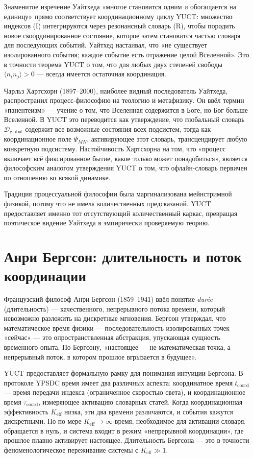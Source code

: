 \documentclass[12pt,a4paper]{article}
\begin{document}
	Знаменитое изречение Уайтхеда «многое становится одним и обогащается на единицу» прямо соответствует координационному циклу YUCT: множество индексов (I) интегрируются через резонансный словарь (R), чтобы породить новое скоординированное состояние, которое затем становится частью словаря для последующих событий. Уайтхед настаивал, что «не существует изолированного события; каждое событие есть отражение целой Вселенной». Это в точности теорема YUCT о том, что для любых двух степеней свободы \(\langle n_i n_j \rangle > 0\) — всегда имеется остаточная координация.
	
	Чарльз Хартсхорн (1897–2000), наиболее видный последователь Уайтхеда, распространил процесс-философию на теологию и метафизику. Он ввёл термин «панентеизм» — учение о том, что Вселенная содержится в Боге, но Бог больше Вселенной. В YUCT это переводится как утверждение, что глобальный словарь \(\mathcal{D}_{\text{global}}\) содержит все возможные состояния всех подсистем, тогда как координационное поле \(\Psi_{MN}\), активирующее этот словарь, трансцендирует любую конкретную подсистему. Настойчивость Хартсхорна на том, что «процесс включает всё фиксированное бытие, какое только может понадобиться», является философским аналогом утверждения YUCT о том, что офлайн-словарь первичен по отношению ко всякой динамике.
	
	Традиция процессуальной философии была маргинализована мейнстримной физикой, потому что не имела количественных предсказаний. YUCT предоставляет именно тот отсутствующий количественный каркас, превращая поэтическое видение Уайтхеда в эмпирически проверяемую теорию.
	
	\section{Анри Бергсон: длительность и поток координации}
	
	Французский философ Анри Бергсон (1859–1941) ввёл понятие \emph{durée} (длительность) — качественного, непрерывного потока времени, который невозможно разложить на дискретные мгновения. Бергсон утверждал, что математическое время физики — последовательность изолированных точек «сейчас» — это опространствленная абстракция, упускающая сущность временного опыта. По Бергсону, «настоящее — не математическая точка, а непрерывный поток, в котором прошлое вгрызается в будущее».
	
	YUCT предоставляет формальную рамку для понимания интуиции Бергсона. В протоколе YPSDC время имеет два различных аспекта: координатное время \(t_{\text{coord}}\) — время передачи индекса (ограниченное скоростью света), и координационное время \(\tau_{\text{coord}}\), измеряющее активацию словарных статей. Когда координационная эффективность \(K_{\mathrm{eff}}\) низка, эти два времени различаются, и события кажутся дискретными. Но по мере \(K_{\mathrm{eff}} \to \infty\) время, необходимое для активации словаря, обращается в нуль, и система входит в режим «непрерывной координации», где прошлое плавно активирует настоящее. Длительность Бергсона — это в точности феноменологическое переживание системы с \(K_{\mathrm{eff}} \gg 1\).
	
\end{document}
